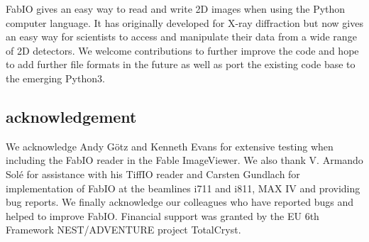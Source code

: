 \documentclass{iucr}
\begin{document}
FabIO gives an easy way to read and write 2D images when using the
Python computer language.
It has originally developed for X-ray diffraction but now gives
an easy way for scientists to access and manipulate
their data from a wide range of 2D detectors.
We welcome contributions to further improve the code and hope to add
further file formats in the future as well as port the existing code base 
to the emerging Python3.


\subsection{acknowledgement}
We acknowledge Andy G\"otz and Kenneth Evans for extensive testing when including
the FabIO reader in the Fable ImageViewer.
We also thank V. Armando Sol\'e for assistance with his TiffIO reader and
Carsten Gundlach for implementation of FabIO at the beamlines i711 and i811, MAX IV and providing bug reports.
We finally acknowledge our colleagues who have reported bugs and helped to
improve FabIO.
Financial support was granted by the EU 6th Framework NEST/ADVENTURE project
TotalCryst.





\appendix
\end{document}
